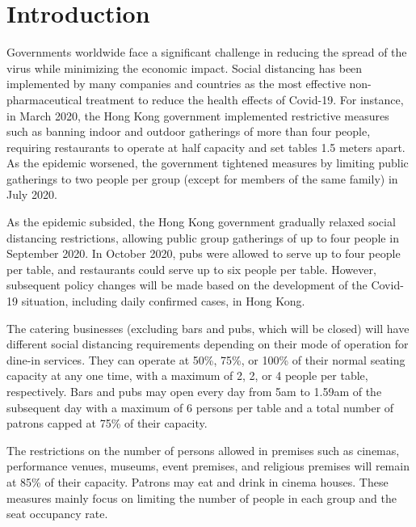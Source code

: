 \section{Introduction}

Governments worldwide face a significant challenge in reducing the spread of the virus while minimizing the economic impact. Social distancing has been implemented by many companies and countries as the most effective non-pharmaceutical treatment to reduce the health effects of Covid-19. For instance, in March 2020, the Hong Kong government implemented restrictive measures such as banning indoor and outdoor gatherings of more than four people, requiring restaurants to operate at half capacity and set tables 1.5 meters apart. As the epidemic worsened, the government tightened measures by limiting public gatherings to two people per group (except for members of the same family) in July 2020.

As the epidemic subsided, the Hong Kong government gradually relaxed social distancing restrictions, allowing public group gatherings of up to four people in September 2020. In October 2020, pubs were allowed to serve up to four people per table, and restaurants could serve up to six people per table. However, subsequent policy changes will be made based on the development of the Covid-19 situation, including daily confirmed cases, in Hong Kong.


The catering businesses (excluding bars and pubs, which will be closed) will have different social distancing requirements depending on their mode of operation for dine-in services. They can operate at 50\%, 75\%, or 100\% of their normal seating capacity at any one time, with a maximum of 2, 2, or 4 people per table, respectively. Bars and pubs may open every day from 5am to 1.59am of the subsequent day with a maximum of 6 persons per table and a total number of patrons capped at 75\% of their capacity.

The restrictions on the number of persons allowed in premises such as cinemas, performance venues, museums, event premises, and religious premises will remain at 85\% of their capacity. Patrons may eat and drink in cinema houses. These measures mainly focus on limiting the number of people in each group and the seat occupancy rate.

